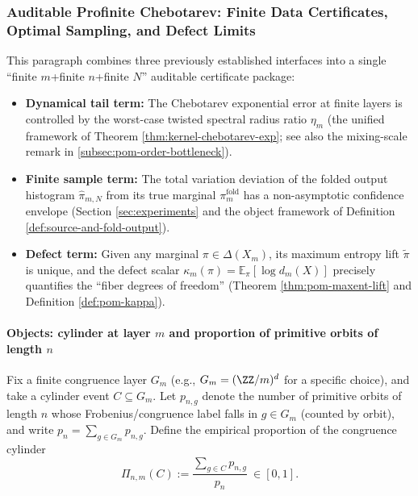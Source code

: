 \subsubsection{Auditable Profinite Chebotarev: Finite Data Certificates, Optimal Sampling, and Defect Limits}\label{subsec:auditable-profinite-chebotarev}

This paragraph combines three previously established interfaces into a single ``finite \(m\)+finite \(n\)+finite \(N\)'' auditable certificate package:
\begin{itemize}
  \item \textbf{Dynamical tail term:} The Chebotarev exponential error at finite layers is controlled by the worst-case twisted spectral radius ratio \(\eta_m\) (the unified framework of Theorem \ref{thm:kernel-chebotarev-exp}; see also the mixing-scale remark in \ref{subsec:pom-order-bottleneck}).
  \item \textbf{Finite sample term:} The total variation deviation of the folded output histogram \(\hat{\pi}_{m,N}\) from its true marginal \(\pi_m^{\mathrm{fold}}\) has a non-asymptotic confidence envelope (Section \ref{sec:experiments} and the object framework of Definition \ref{def:source-and-fold-output}).
  \item \textbf{Defect term:} Given any marginal \(\pi\in\Delta(X_m)\), its maximum entropy lift \(\widetilde\pi\) is unique, and the defect scalar \(\kappa_m(\pi)=\mathbb{E}_\pi[\log d_m(X)]\) precisely quantifies the ``fiber degrees of freedom'' (Theorem \ref{thm:pom-maxent-lift} and Definition \ref{def:pom-kappa}).
\end{itemize}

\paragraph{Objects: cylinder at layer \(m\) and proportion of primitive orbits of length \(n\)}
Fix a finite congruence layer \(G_m\) (e.g., \(G_m=(\ZZ/m)^d\) for a specific choice), and take a cylinder event \(C\subseteq G_m\).
Let \(p_{n,g}\) denote the number of primitive orbits of length \(n\) whose Frobenius/congruence label falls in \(g\in G_m\) (counted by orbit), and write \(p_n=\sum_{g\in G_m}p_{n,g}\).
Define the empirical proportion of the congruence cylinder
\[
\Pi_{n,m}(C):=\frac{\sum_{g\in C}p_{n,g}}{p_n}\ \in[0,1].
\]

